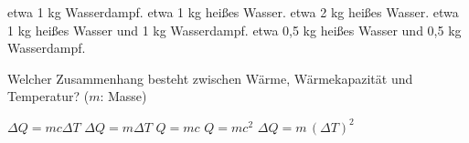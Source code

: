 \documentclass[11pt]{exam}
\begin{document}
\begin{questions}
\begin{choices}
	\choice etwa 1 kg Wasserdampf.
	\choice etwa 1 kg heißes Wasser.
	\choice etwa 2 kg heißes Wasser.
	\choice etwa 1 kg heißes Wasser und 1 kg Wasserdampf.
	\choice etwa 0,5 kg heißes Wasser und 0,5 kg Wasserdampf.
\end{choices}

\vspace{3mm}\question Welcher Zusammenhang besteht zwischen Wärme, Wärmekapazität und Temperatur? (\(m\): Masse)

\begin{choices}
	\choice \(\Delta Q = m c \Delta T\)
	\choice \(\Delta Q = m \Delta T\)
	\choice \(Q = m c\)
	\choice \(Q = m c^2\)
	\choice \(\Delta Q = m \, (\Delta T)^2\)
\end{choices}

\vspace{3mm}\end{questions}
\end{document}
